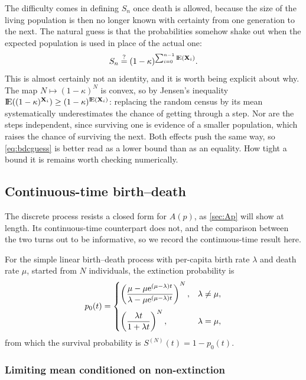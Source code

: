 The difficulty comes in defining $S_n$ once death is allowed, because the size of
the living population is then no longer known with certainty from one generation to
the next. The natural guess is that the probabilities somehow shake out when the
expected population is used in place of the actual one:
\begin{equation}
\label{eq:bdcguess}
S_n \overset{?}{=} (1-\kappa)^{\sum_{i=0}^{n-1}{\rm I}\!{\rm E}({\bf X}_i)} .
\end{equation}
This is almost certainly not an identity, and it is worth being explicit about why.
The map $N\mapsto(1-\kappa)^N$ is convex, so by Jensen's inequality
${\rm I}\!{\rm E}((1-\kappa)^{{\bf X}_i})\ge(1-\kappa)^{{\rm I}\!{\rm E}({\bf X}_i)}$: replacing the random census
by its mean systematically underestimates the chance of getting through a step.
Nor are the steps independent, since surviving one is evidence of a smaller
population, which raises the chance of surviving the next. Both effects push the
same way, so \cref{eq:bdcguess} is better read as a lower bound than as an equality.
How tight a bound it is remains worth checking numerically.

\subsection{Continuous-time birth--death}
\label{sec:cts}

The discrete process resists a closed form for $A(p)$, as \cref{sec:Ap} will show at
length. Its continuous-time counterpart does not, and the comparison between the two
turns out to be informative, so we record the continuous-time result here.

For the simple linear birth--death process with per-capita birth rate $\lambda$ and
death rate $\mu$, started from $N$ individuals, the extinction probability is
\cite{Allen2010}
\begin{equation}
\label{eq:p0t}
p_0(t) = \begin{cases}
\left(\dfrac{\mu - \mu {\rm e}^{(\mu-\lambda)t}}{\lambda - \mu {\rm e}^{(\mu-\lambda)t}}\right)^{N}, & \lambda \neq \mu,\\[12pt]
\left(\dfrac{\lambda t}{1+\lambda t}\right)^{N}, & \lambda = \mu,
\end{cases}
\end{equation}
from which the survival probability is $S^{(N)}(t) = 1 - p_0(t)$.

\subsubsection*{Limiting mean conditioned on non-extinction}

